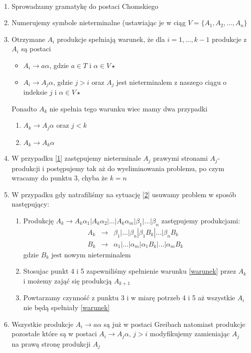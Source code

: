 	\begin{alg}~\\
		\begin{enumerate}
			\item Sprowadzamy gramatykę do postaci Chomskiego
			\item Numerujemy symbole nieterminalne (ustawiając je w ciąg $V = \{A_1, A_2, \dots, A_n\}$
			\item Otrzymane $A_i$ produkcje spełniają warunek, że dla $i=1,\dots, k-1$ produkcje z $A_i$ są postaci
				\begin{itemize}\label{warunek}
					\item $A_i \rightarrow a\alpha$, gdzie $a\in T$ i $\alpha\in V\star$
					\item $A_i \rightarrow A_j\alpha$, gdzie $j > i$ 
					oraz $A_j$ jest nieterminalem z naszego ciągu o indeksie $j$ i $\alpha \in V\star$
				\end{itemize}
			Ponadto $A_k$ nie spełnia tego warunku wiec mamy dwa przypadki
				\begin{enumerate}
					\item $A_k \rightarrow A_j\alpha$ oraz $j < k$\label{1}
					\item $A_k \rightarrow A_k\alpha$\label{2}
				\end{enumerate}
			\item W przypadku \ref{1} zastępujemy nieterminale $A_j$ prawymi stronami $A_j$-produkcji
			i postępujemy tak aż do wyeliminowania problemu, po czym wracamy do punktu 3, chyba że $k = n$
			\item W przypadku gdy natrafiliśmy na sytuację \ref{2} usuwamy problem w sposób następujący:
				\begin{enumerate}
					\item Produkcję $A_k \rightarrow A_k\alpha_1|A_k\alpha_2|\dots|A_k\alpha_m|\beta_1|\dots|\beta_n$
					zastępujemy produkcjami:
					\begin{eqnarray}
						A_k &\rightarrow& \beta_1|\dots|\beta_n|\beta_1B_k|\dots|\beta_nB_k \\
						B_k &\rightarrow& \alpha_1|\dots|\alpha_m|\alpha_1B_k|\dots|\alpha_mB_k									
					\end{eqnarray}
					gdzie $B_k$ jest nowym nieterminalem
					\item Stosujac punkt 4 i 5 zapewniliśmy spełnienie warunku \ref{warunek} przez $A_k$ i możemy zająć się produkcją $A_{k+1}$
					\item Powtarzamy czynność z punktu 3 i w miarę potrzeb 4 i 5 aż wszystkie $A_i$ nie będą spełniały \ref{warunek}
				\end{enumerate}
			\item Wszystkie produkcje $A_i \rightarrow a\alpha$ są już w postaci Greibach natomiast produkcje pozostałe które są w postaci
			$A_i\rightarrow A_j\alpha$, $j > i$ modyfikujemy zamieniając $A_j$ na prawą stronę produkcji $A_j$
		\end{enumerate}
	\end{alg}
	
